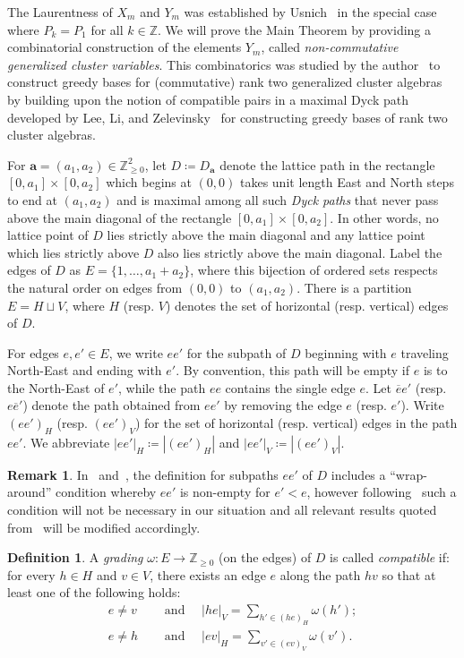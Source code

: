 \documentclass[10pt]{amsart}
\theoremstyle{definition}
\newtheorem{definition}[theorem]{Definition}
\newtheorem{remark}[theorem]{Remark}
\newcommand{\bfa}{\mathbf{a}}
\newcommand{\ZZ}{\mathbb{Z}}
\begin{document}
 The Laurentness of $X_m$ and $Y_m$ was established by Usnich~\cite{usnich2} in the special case where $P_k=P_1$ for all $k\in\ZZ$.
 We will prove the Main Theorem by providing a combinatorial construction of the elements $Y_m$, called \emph{non-commutative generalized cluster variables}. 
 This combinatorics was studied by the author~\cite{rupel2} to construct greedy bases for (commutative) rank two generalized cluster algebras by building upon the notion of compatible pairs in a maximal Dyck path developed by Lee, Li, and Zelevinsky~\cite{lee-li-zelevinsky} for constructing greedy bases of rank two cluster algebras.

 For $\bfa=(a_1,a_2)\in\ZZ_{\ge0}^2$, let $D\coloneqq D_\bfa$ denote the lattice path in the rectangle $[0,a_1]\times[0,a_2]$ which begins at $(0,0)$ takes unit length East and North steps to end at $(a_1,a_2)$ and is maximal among all such \emph{Dyck paths} that never pass above the main diagonal of the rectangle $[0,a_1]\times[0,a_2]$. 
 In other words, no lattice point of $D$ lies strictly above the main diagonal and any lattice point which lies strictly above $D$ also lies strictly above the main diagonal.
 Label the edges of $D$ as $E=\{1,\ldots,a_1+a_2\}$, where this bijection of ordered sets respects the natural order on edges from $(0,0)$ to $(a_1,a_2)$.
 There is a partition $E=H\sqcup V$, where $H$ (resp. $V$) denotes the set of horizontal (resp. vertical) edges of $D$. 

 For edges $e,e'\in E$, we write $ee'$ for the subpath of $D$ beginning with $e$ traveling North-East and ending with $e'$. 
 By convention, this path will be empty if $e$ is to the North-East of $e'$, while the path $ee$ contains the single edge $e$. 
 Let $\overline{e}e'$ (resp. $e\overline{e}'$) denote the path obtained from $ee'$ by removing the edge $e$ (resp. $e'$). 
 Write $(ee')_H$ (resp. $(ee')_V$) for the set of horizontal (resp. vertical) edges in the path $ee'$.
 We abbreviate $|ee'|_H\coloneqq |(ee')_H|$ and $|ee'|_V\coloneqq |(ee')_V|$. 
 
 \begin{remark}
 In~\cite{lee-li-zelevinsky} and~\cite{rupel2}, the definition for subpaths $ee'$ of $D$ includes a ``wrap-around'' condition whereby $ee'$ is non-empty for $e'<e$, however following~\cite[Remark~2.21]{rupel2} such a condition will not be necessary in our situation and all relevant results quoted from~\cite{rupel2} will be modified accordingly.
 \end{remark}

 \begin{definition}
 \label{def:compatibility}
 A \emph{grading} $\omega:E\to\ZZ_{\ge0}$ (on the edges) of $D$ is called \emph{compatible} if: for every $h\in H$ and $v\in V$, there exists an edge $e$ along the path $hv$ so that at least one of the following holds:
 \begin{align}
 \tag{HGC}\label{eq:hgc} e\ne v\quad&\text{ and }\quad |he|_V=\sum\limits_{h'\in(he)_H} \omega(h');\\
 \tag{VGC}\label{eq:vgc} e\ne h\quad&\text{ and }\quad |ev|_H=\sum\limits_{v'\in(ev)_V} \omega(v').
 \end{align}
 \end{definition}
\end{document}
